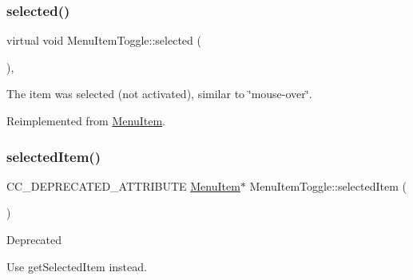 \mbox{\label{classMenuItemToggle_ad10d606528c3625314bf75e5db442bf4}} 
\subsubsection{\texorpdfstring{selected()}{selected()}\hspace{0.1cm}{\footnotesize\ttfamily [2/2]}}
{\footnotesize\ttfamily virtual void Menu\+Item\+Toggle\+::selected (\begin{DoxyParamCaption}{ }\end{DoxyParamCaption})\hspace{0.3cm}{\ttfamily [override]}, {\ttfamily [virtual]}}

The item was selected (not activated), similar to \char`\"{}mouse-\/over\char`\"{}. 

Reimplemented from \hyperlink{classMenuItem_aa0330b2c1e2066eb7eee87ade6e6740f}{Menu\+Item}.

\mbox{\label{classMenuItemToggle_a290e987c2bf2190b9aac3287617d4e9d}} 
\subsubsection{\texorpdfstring{selected\+Item()}{selectedItem()}\hspace{0.1cm}{\footnotesize\ttfamily [1/2]}}
{\footnotesize\ttfamily C\+C\+\_\+\+D\+E\+P\+R\+E\+C\+A\+T\+E\+D\+\_\+\+A\+T\+T\+R\+I\+B\+U\+TE \hyperlink{classMenuItem}{Menu\+Item}$\ast$ Menu\+Item\+Toggle\+::selected\+Item (\begin{DoxyParamCaption}{ }\end{DoxyParamCaption})\hspace{0.3cm}{\ttfamily [inline]}}

\begin{DoxyRefDesc}{Deprecated}
\item[\hyperlink{deprecated__deprecated000028}{Deprecated}]Use {\ttfamily get\+Selected\+Item} instead. \end{DoxyRefDesc}
\mbox{\label{classMenuItemToggle_a290e987c2bf2190b9aac3287617d4e9d}} 
